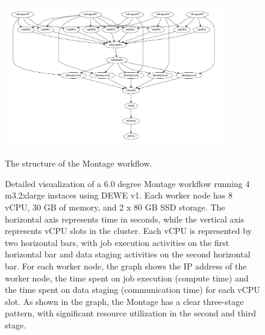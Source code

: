 \begin{figure}[!t]
	\centering
	\hspace{-10pt}
	\includegraphics[width=9.7cm, height=7cm]{montage}
    \caption{The structure of the Montage workflow.}
    \vspace{-10pt}
	\label{fig:montage}
\end{figure}

\begin{figure}[ht]
\centering
{}
\caption{Detailed visualization of a 6.0 degree Montage workflow running 4 m3.2xlarge instaces using DEWE v1. Each worker node has 8 vCPU, 30 GB of memory, and 2 x 80 GB SSD storage. The horizontal axis represents time in seconds, while the vertical axis represents vCPU slots in the cluster. Each vCPU is represented by two horizontal bars, with job execution activities on the first horizontal bar and data staging activities on the second horizontal bar. For each worker node, the graph shows the IP address of the worker node, the time spent on job execution (compute time) and the time spent on data staging (communication time) for each vCPU slot. As shown in the graph, the Montage has a clear three-stage pattern, with significant resource utilization in the second and third stage.}
\label{fig:montage_visualization}
\end{figure}

